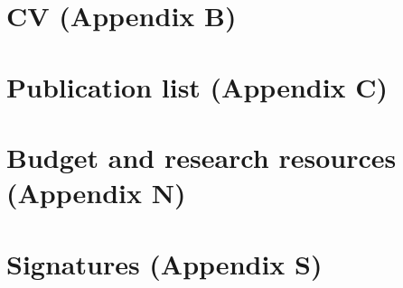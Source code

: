 \documentclass[10pt,a4paper]{article}
\begin{document}
\section{CV (Appendix B)}
\section{Publication list (Appendix C)}
\section{Budget and research resources (Appendix N)}
\section{Signatures (Appendix S)}



\pagebreak
{}


\end{document}
